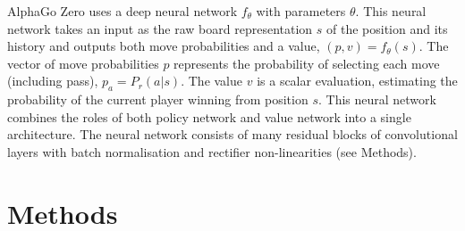 \documentclass[12pt,a4paper]{report}
\begin{document}
AlphaGo Zero uses a deep neural network \(f_\theta\) with parameters \(\theta\). This neural network takes an input as the raw board representation \(s\) of the position and its history and outputs both move probabilities and a value, \((p, v) = f_\theta(s)\). The vector of move probabilities \(p\) represents the probability of selecting each move (including pass), \(p_a = P_r(a|s)\). The value \(v\) is a scalar evaluation, estimating the probability of the current player winning from position \(s\). This neural network combines the roles of both policy network and value network\cite{AlphaGo} into a single architecture. The neural network consists of many residual blocks\cite{ResNet} of convolutional layers\cite{CNNpaper} with batch normalisation\cite{BN} and rectifier non-linearities\cite{ReLU} (see Methods).\par
\clearpage
\chapter{Methods}\thispagestyle{fancy}
\end{document}
